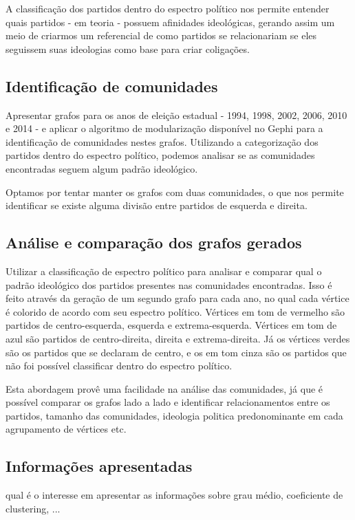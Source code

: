 A classificação dos partidos dentro do espectro político nos permite entender quais partidos - em teoria - possuem afinidades ideológicas, gerando assim um meio de criarmos um referencial de como partidos se relacionariam se eles seguissem suas ideologias como base para criar coligações.

\subsection{Identificação de comunidades}
\label{proposta__objetivos-especificos--identificacao-comunidades}

Apresentar grafos para os anos de eleição estadual - 1994, 1998, 2002, 2006, 2010 e 2014 - e aplicar o algoritmo de modularização disponível no Gephi para a identificação de comunidades nestes grafos. Utilizando a categorização dos partidos dentro do espectro político, podemos analisar se as comunidades encontradas seguem algum padrão ideológico.

Optamos por tentar manter os grafos com duas comunidades, o que nos permite identificar se existe alguma divisão entre partidos de esquerda e direita.

\subsection{Análise e comparação dos grafos gerados}
\label{proposta__objetivos-especificos--analise-comparacao}

Utilizar a classificação de espectro político para analisar e comparar qual o padrão ideológico dos partidos presentes nas comunidades encontradas. Isso é feito através da geração de um segundo grafo para cada ano, no qual cada vértice é colorido de acordo com seu espectro político. Vértices em tom de vermelho são partidos de centro-esquerda, esquerda e extrema-esquerda. Vértices em tom de azul são partidos de centro-direita, direita e extrema-direita. Já os vértices verdes são os partidos que se declaram de centro, e os em tom cinza são os partidos que não foi possível classificar dentro do espectro político.

Esta abordagem provê uma facilidade na análise das comunidades, já que é possível comparar os grafos lado a lado e identificar relacionamentos entre os partidos, tamanho das comunidades, ideologia politica predonominante em cada agrupamento de vértices etc.
\subsection{Informações apresentadas}
\label{proposta__objetivos-especificos--informacoes-apresentadas}

qual é o interesse em apresentar as informações sobre grau médio, coeficiente de clustering, ...
